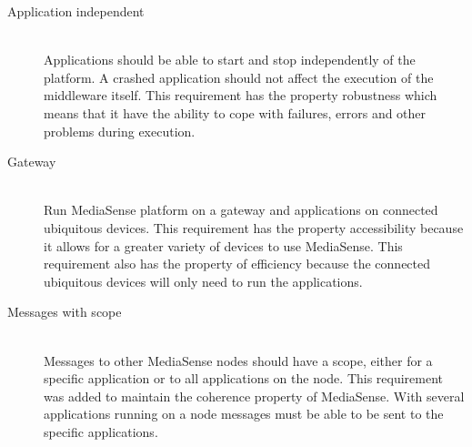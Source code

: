 \begin{description}
	\item[Application independent] \hfill \\
	Applications should be able to start and stop independently of the platform. A crashed application should not affect the execution of the middleware itself. This requirement has the property robustness which means that it have the ability to cope with failures, errors and other problems during execution.
	
	\item[Gateway] \hfill \\
	Run MediaSense platform on a gateway and applications on connected ubiquitous devices.
This requirement has the property accessibility because it allows for a greater variety of devices to use MediaSense. This requirement also has the property of efficiency because the connected ubiquitous devices will only need to run the applications.
	
	\item[Messages with scope] \hfill \\
	Messages to other MediaSense nodes should have a scope, either for a specific application or to all applications on the node. This requirement was added to maintain the coherence property of MediaSense. With several applications running on a node messages must be able to be sent to the specific applications.

	
\end{description}	

